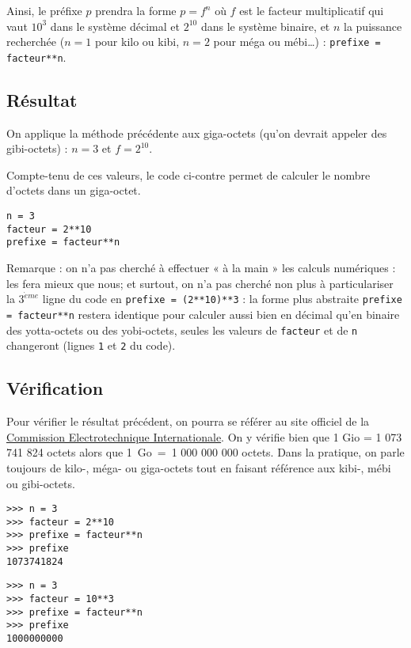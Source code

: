 Ainsi, le préfixe $p$ prendra la forme $p = f^n$ où $f$ est le facteur multiplicatif qui vaut $10^3$
dans le système décimal et $2^{10}$ dans le système binaire, et $n$ la puissance recherchée
($n=1$ pour kilo ou kibi, $n=2$ pour méga ou mébi\ldots) : \texttt{prefixe = facteur**n}.

\subsection{Résultat}\label{affectation:informatique:resultat}
On applique la méthode précédente aux giga-octets (qu'on devrait appeler des gibi-octets) :
$n = 3$ et $f = 2^{10}$.

\noindent\begin{minipage}{7cm}
Compte-tenu de ces valeurs, le code \python{} ci-contre
permet de calculer le nombre d'octets dans un giga-octet.
\end{minipage}
\hfill
\begin{minipage}{8cm}
\begin{lstlisting}[caption=\textbf{giga-octets ou gibi-octets}]
n = 3
facteur = 2**10
prefixe = facteur**n
\end{lstlisting}
\end{minipage}

Remarque : on n'a pas cherché à effectuer « à la main » les calculs numériques :
\python{} les fera mieux que nous; et surtout, on n'a pas cherché non plus à 
particulariser la $3^{\grave eme}$ ligne du code en \texttt{prefixe = (2**10)**3} :
la forme plus abstraite \texttt{prefixe = facteur**n} restera identique pour calculer
aussi bien en décimal qu'en binaire des yotta-octets ou des yobi-octets, 
seules les valeurs de \texttt{facteur} et de \texttt{n} changeront (lignes \texttt{1} 
et \texttt{2} du code).

\subsection{Vérification}\label{affectation:informatique:verification}
Pour vérifier le résultat précédent, on pourra se référer au site officiel de la
\href{http://www.electropedia.org/iev/iev.nsf/display?openform&ievref=112-01-27}{Commission Electrotechnique Internationale}.
On y vérifie bien que 1 Gio = 1 073 741 824 octets alors que 1~Go~=~1 000 000 000 octets.
Dans la pratique, on parle toujours de kilo-, méga- ou giga-octets 
tout en faisant référence aux kibi-, mébi ou gibi-octets.

\begin{minipage}[t]{7.5cm}\footnotesize
\begin{Verbatim}
>>> n = 3
>>> facteur = 2**10
>>> prefixe = facteur**n
>>> prefixe
1073741824
\end{Verbatim}
\end{minipage}
\hfill
\begin{minipage}[t]{7.5cm}\footnotesize
\begin{Verbatim}
>>> n = 3
>>> facteur = 10**3
>>> prefixe = facteur**n
>>> prefixe
1000000000
\end{Verbatim}
\end{minipage}
\vspace*{2mm}

